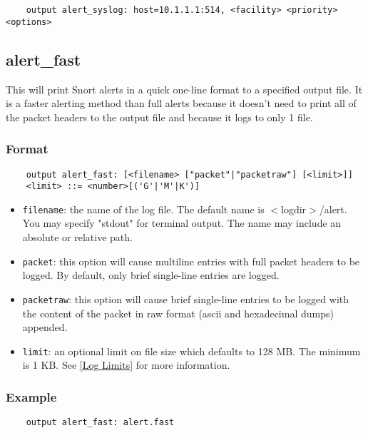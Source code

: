 \documentclass[english]{report}
\begin{document}
\begin{verbatim}
    output alert_syslog: host=10.1.1.1:514, <facility> <priority> <options>
\end{verbatim}

\subsection{alert\_fast}

This will print Snort alerts in a quick one-line format to a specified output
file. It is a faster alerting method than full alerts because it doesn't need
to print all of the packet headers to the output file and because it logs to
only 1 file.

\subsubsection{Format}

\begin{verbatim}
    output alert_fast: [<filename> ["packet"|"packetraw"] [<limit>]]
    <limit> ::= <number>[('G'|'M'|K')]
\end{verbatim}

\begin{itemize}
\item \texttt{filename}: the name of the log file.  The default name is
$<$logdir$>$/alert.  You may specify "stdout" for terminal output.  The name may
include an absolute or relative path.

\item \texttt{packet}: this option will cause multiline entries with full
packet headers to be logged.  By default, only brief single-line entries are
logged.

\item \texttt{packetraw}: this option will cause brief single-line entries
to be logged with the content of the packet in raw format (ascii and hexadecimal
dumps) appended.

\item \texttt{limit}: an optional limit on file size which defaults to 128 MB.  
The minimum is 1 KB.  See \ref{Log Limits} for more information.
\end{itemize}

\subsubsection{Example}

\begin{verbatim}
    output alert_fast: alert.fast
\end{verbatim}
\end{document}
